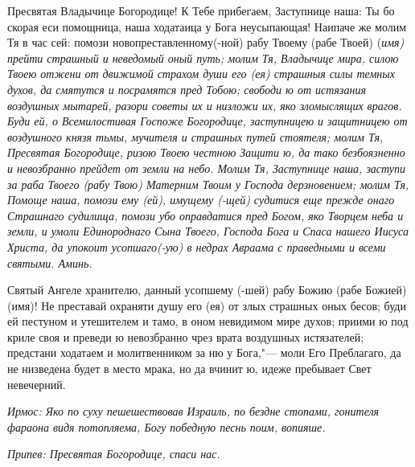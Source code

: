  


Пресвятая Владычице Богородице! К Тебе прибегаем, Заступнице наша: Ты бо скорая еси помощница, наша ходатаица у Бога неусыпающая! Наипаче же молим Тя в час сей: помози новопреставленному(-ной) рабу Твоему (рабе Твоей) (\itshape имя\normalfont{}) прейти страшный и неведомый оный путь; молим Тя, Владычице мира, силою Твоею отжени от движимой страхом души его (ея) страшныя силы темных духов, да смятутся и посрамятся пред Тобою; свободи ю от истязания воздушных мытарей, разори советы их и низложи их, яко зломыслящих врагов. Буди ей, о Всемилостивая Госпоже Богородице, заступницею и защитницею от воздушного князя тьмы, мучителя и страшных путей стоятеля; молим Тя, Пресвятая Богородице, ризою Твоею честною Защити ю, да тако безбоязненно и невозбранно прейдет от земли на небо. Молим Тя, Заступнице наша, заступи за раба Твоего (рабу Твою) Матерним Твоим у Господа дерзновением; молим Тя, Помоще наша, помози ему (ей), имущему (-щей) судитися еще прежде онаго Страшнаго судилища, помози убо оправдатися пред Богом, яко Творцем неба и земли, и умоли Единороднаго Сына Твоего, Господа Бога и Спаса нашего Иисуса Христа, да упокоит усопшаго(-ую) в недрах Авраама с праведными и всеми святыми. Аминь.
\mychapterending

 


Святый Ангеле хранителю, данный усопшему (-шей) рабу Божию (рабе Божией) (имя)! Не преставай охраняти душу его (ея) от злых страшных оных бесов; буди ей пестуном и утешителем и тамо, в оном невидимом мире духов; приими ю под криле своя и преведи ю невозбранно чрез врата воздушных истязателей; предстани ходатаем и молитвенником за ню у Бога,"--- моли Его Преблагаго, да не низведена будет в место мрака, но да вчинит ю, идеже пребывает Свет невечерний. 
\mychapterending

 




\itshape Ирмос:\normalfont{} Яко по суху пешешествовав Израиль, по бездне стопами, гонителя фараона видя потопляема, Богу победную песнь поим, вопияше. 

\itshape Припев:\normalfont{} Пресвятая Богородице, спаси нас. 

